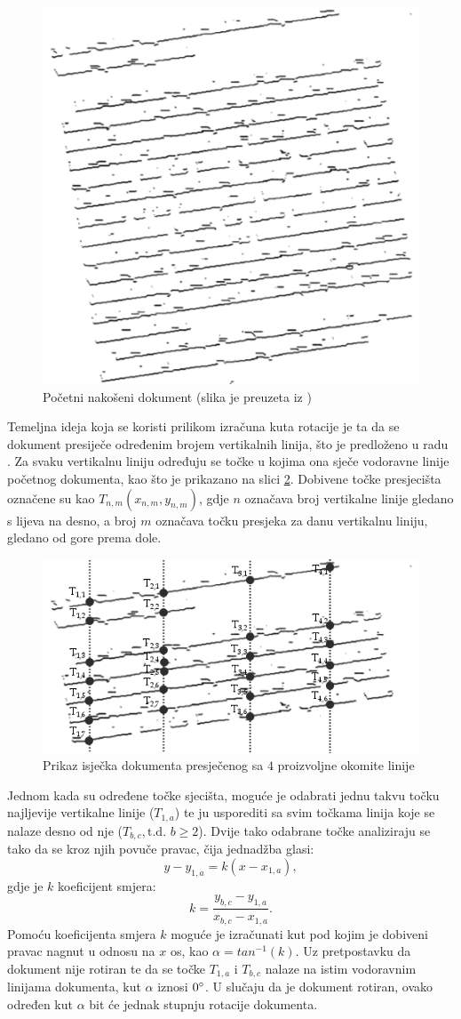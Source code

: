 \documentclass[times, utf8, zavrsni, numeric]{fer}
\begin{document}
\begin{figure}[ht!] 
    \centering
    \includegraphics[width=.4\textwidth]{Images/Skew_original.png}
    \captionsetup{justification=centering}
    \caption{Početni nakošeni dokument (slika je preuzeta iz \cite{article:Skew-detection})}
    \label{fig:skew_original}
\end{figure}

Temeljna ideja koja se koristi prilikom izračuna kuta rotacije je ta da se dokument presiječe određenim brojem vertikalnih linija, što je predloženo u radu \cite{article:Skew-detection}.
Za svaku vertikalnu liniju određuju se točke u kojima ona sječe vodoravne linije početnog dokumenta, kao što je prikazano na slici \ref{fig:skew_points}.
Dobivene točke presjecišta označene su kao $T_{n, m}(x_{n, m}, y_{n, m})$, gdje $n$ označava broj vertikalne linije gledano s lijeva na desno, a broj $m$ označava točku presjeka za danu vertikalnu liniju, gledano od gore prema dole.

\begin{figure}[ht!] 
    \centering
    \includegraphics[width=.7\textwidth]{Images/Skew_points.png}
    \captionsetup{justification=centering}
    \caption{Prikaz isječka dokumenta presječenog sa $4$ proizvoljne okomite linije}
    \label{fig:skew_points}
\end{figure}

Jednom kada su određene točke sjecišta, moguće je odabrati jednu takvu točku najljevije vertikalne linije ($T_{1, a}$) te  ju usporediti sa svim točkama linija koje se nalaze desno od nje ($T_{b, c}, \text{t.d. } b \geq 2$).
Dvije tako odabrane točke analiziraju se tako da se kroz njih povuče pravac, čija jednadžba glasi: 
\[
    y - y_{1, a} = k(x - x_{1, a}),
\]
gdje je $k$ koeficijent smjera:
\[
    k = \frac{y_{b, c} - y_{1, a}}{x_{b, c} - x_{1, a}}.
\]
Pomoću koeficijenta  smjera $k$ moguće je izračunati kut pod kojim je dobiveni pravac nagnut u odnosu na $x$ os, kao $\alpha = tan^{-1}(k)$.
Uz pretpostavku da dokument nije rotiran te da se točke $T_{1, a}$ i $T_{b, c}$ nalaze na istim vodoravnim linijama dokumenta, kut $\alpha$ iznosi $0\degree$.
U slučaju da je dokument rotiran, ovako određen kut $\alpha$ bit će jednak stupnju rotacije dokumenta.\\
\end{document}
